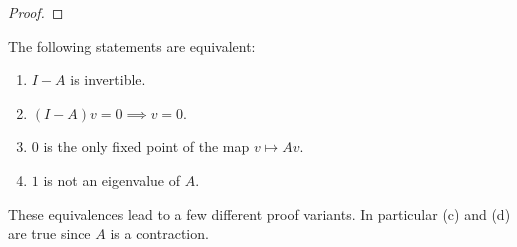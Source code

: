 \documentclass[12pt]{article}
\begin{document}
\begin{enumerate}[label=(\roman*)]
\begin{proof}
  \end{proof}

  \begin{remark*}
    The following statements are equivalent:
    \begin{enumerate}
    \item $I - A$ is invertible.
    \item $(I - A)v = 0 \implies v = 0$.
    \item $0$ is the only fixed point of the map $v \mapsto Av$.
    \item $1$ is not an eigenvalue of $A$.
    \end{enumerate}
    These equivalences lead to a few different proof variants. In particular (c) and (d) are true
    since $A$ is a contraction.
  \end{remark*}





\end{enumerate}
\end{document}
